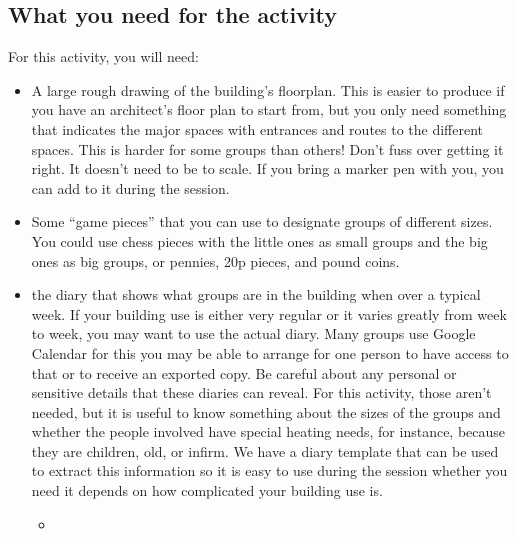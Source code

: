 \documentclass[letterpaper,10pt,english]{jupyterBook}
\begin{document}
\subsection{What you need for the activity}
\label{\detokenize{session3/details/activity:what-you-need-for-the-activity}}
\sphinxAtStartPar
For this activity, you will need:
\begin{itemize}
\item {} 
\sphinxAtStartPar
A large rough drawing of the building’s floorplan. This is easier to produce if you have an architect’s floor plan to start from, but you only need something that indicates the major spaces with entrances and routes to the different spaces.  This is harder for some groups than others!  Don’t fuss over getting it right. It doesn’t need to be to scale.  If you bring a marker pen with you, you can add to it during the session.

\item {} 
\sphinxAtStartPar
Some “game pieces” that you can use to designate groups of different sizes.  You could use chess pieces with the little ones as small groups and the big ones as big groups, or pennies, 20p pieces, and pound coins.

\item {} 
\sphinxAtStartPar
the diary that shows what groups are in the building when over a typical week.  If your building use is either very regular or it varies greatly from week to week, you may want to use the actual diary.  Many groups use Google Calendar for this \sphinxhyphen{} you may be able to arrange for one person to have access to that or to receive an exported copy.  Be careful about any personal or sensitive details that these diaries can reveal.  For this activity, those aren’t needed, but it is useful to know something about the sizes of the groups and whether the people involved have special heating needs, for instance, because they are children, old, or infirm.  We have a diary template that can be used to extract this information so it is easy to use during the session \sphinxhyphen{} whether you need it depends on how complicated your building use is.
\begin{itemize}
\item {} 
\sphinxAtStartPar
{}

\end{itemize}

\end{itemize}
\end{document}
